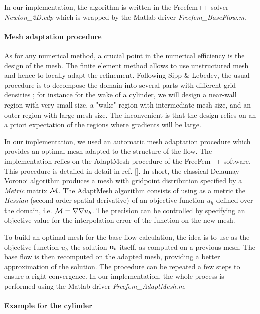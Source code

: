 \documentclass{elsarticle}
\begin{document}
In our implementation, the algorithm is written in the Freefem++ solver {\em Newton\_2D.edp} 
which is wrapped by the Matlab driver {\em Freefem\_BaseFlow.m}.


\paragraph{Mesh adaptation procedure}

As for any numerical method, a crucial point in the numerical efficiency is the design of the mesh. The finite element method allows to use unstructured mesh and hence to locally adapt the refinement. Following Sipp & Lebedev, the usual procedure is to decompose the domain into several parts with different grid densities ; for instance for the wake of a cylinder, we will design a near-wall region with very small  size, a "wake" region with intermediate mesh size, and an outer region with large mesh size. The inconvenient is that the design relies on an a priori expectation of the regions where gradients will be large. 

In our implementation, we used an automatic mesh adaptation procedure which provides an optimal mesh adapted to the structure of the flow. The implementation relies on the AdaptMesh procedure of the FreeFem++ software. This procedure is detailed in detail in ref. []. In short, 
the classical Delaunay-Voronoi algorithm produces a mesh with gridpoint distribution specified by a {\em Metric } matrix $\cal M$. The AdaptMesh algorithm consists of using as a metric the {\em Hessian} (second-order spatial derivative) of an objective function $u_h$ defined over the domain, i.e. ${\cal M} = \nabla \nabla u_h$. The precision can be controlled by specifying an objective value for the interpolation error of the function on the new mesh.

To build an optimal mesh for the base-flow calculation, the idea is to use as the objective function $u_h$ the solution ${\bf u}_b$ itself, as computed on a previous mesh.%
The base flow is then recomputed on the adapted mesh, providing a better approximation of the solution. The procedure can be repeated a few steps to ensure a right convergence.
In our implementation, the whole process is performed using the Matlab driver
 {\em Freefem\_AdaptMesh.m}.





\paragraph{Example for the cylinder}
\end{document}
